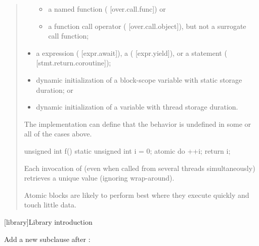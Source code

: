 \begin{quote}
\begin{itemize}
  \begin{itemize}
  \item
    a named function ( {[}over.call.func{]}) or
  \item
    a function call operator (
    {[}over.call.object{]}), but not a surrogate call function;
  \end{itemize}
\item
  a  expression ( {[}expr.await{]}), a
   ( {[}expr.yield{]}), or a
   statement ( {[}stmt.return.coroutine{]});
\item
  dynamic initialization of a block-scope variable with static storage
  duration; or
\item
  dynamic initialization of a variable with thread storage duration.
\end{itemize}

\begin{note}
The implementation can define that the behavior is
undefined in some or all of the cases above.
\end{note}

\begin{example}
\begin{codeblock}
unsigned int f()
{
  static unsigned int i = 0;
  atomic do {
    ++i;
    return i;
  }
}
\end{codeblock}

Each invocation of 
(even when called from several threads simultaneously)
retrieves a unique value (ignoring wrap-around).
\end{example}

\begin{note}
Atomic blocks are likely to perform best where they execute
quickly and touch little data.
\end{note}
\end{quote}

\setcounter{chapter}{15}

[library]{Library introduction}

\setcounter{section}{4}
\setcounter{subsection}{6}
\setcounter{subsubsection}{16}

Add a new subclause after :

